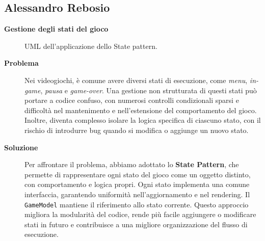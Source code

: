 \documentclass[a4paper,12pt]{report}
\begin{document}
\subsection{Alessandro Rebosio}
\textbf{Gestione degli stati del gioco}
\begin{figure}[H]
	\centering{}
	
	\caption{UML dell'applicazione dello State pattern.}
	\label{img:modelstate}
\end{figure}
\begin{description}
	\item[\textbf{Problema}]
	      Nei videogiochi, è comune avere diversi stati di esecuzione, come \textit{menu}, \textit{in-game}, \textit{pausa} e \textit{game-over}. Una gestione non strutturata di questi stati
	      può portare a codice confuso, con numerosi controlli condizionali sparsi e difficoltà nel mantenimento e nell'estensione del comportamento del gioco. Inoltre, diventa complesso isolare
	      la logica specifica di ciascuno stato, con il rischio di introdurre bug quando si modifica o aggiunge un nuovo stato.

	\item[\textbf{Soluzione}]
	      Per affrontare il problema, abbiamo adottato lo \textbf{State Pattern}, che permette di rappresentare ogni stato del gioco come un oggetto distinto, con comportamento e
	      logica propri. Ogni stato implementa una comune interfaccia, garantendo uniformità nell'aggiornamento e nel rendering. Il \texttt{GameModel} mantiene il riferimento allo stato corrente.
	      Questo approccio migliora la modularità del codice, rende più facile aggiungere o modificare stati in futuro e contribuisce a una migliore organizzazione del flusso di esecuzione.
\end{description}
\end{document}
